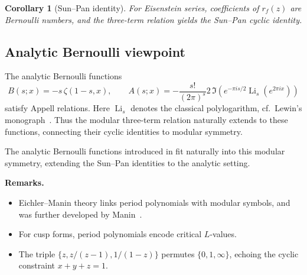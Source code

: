 \documentclass[12pt]{article}
\numberwithin{equation}{section}
\newtheorem{corollary}[theorem]{Corollary}
\newcommand{\Li}{\operatorname{Li}}
\begin{document}
\begin{corollary}[Sun--Pan identity]
For Eisenstein series, coefficients of $r_f(z)$ are Bernoulli numbers, and the
three-term relation yields the Sun--Pan cyclic identity.
\end{corollary}

\subsection*{Analytic Bernoulli viewpoint}
The analytic Bernoulli functions
\[
B(s;x)=-s\,\zeta(1-s,x),\qquad
A(s;x)=-\frac{s!}{(2\pi)^s}2\,\Im\!\left(e^{-\pi i s/2}\Li_s(e^{2\pi i x})\right)
\]
satisfy Appell relations. Here $\Li_s$ denotes the classical polylogarithm,
cf.~Lewin’s monograph~\cite{Lewin1981}.
Thus the modular three-term relation naturally extends to these functions,
connecting their cyclic identities to modular symmetry.

The analytic Bernoulli functions introduced in \cite{Nagai2025b}
fit naturally into this modular symmetry, extending the Sun--Pan
identities to the analytic setting.

\noindent\textbf{Remarks.}
\begin{itemize}
\item Eichler--Manin theory links period polynomials with modular symbols, and was further developed by Manin~\cite{Manin1972}.
\item For cusp forms, period polynomials encode critical $L$-values.
\item The triple $\{z,z/(z-1),1/(1-z)\}$ permutes $\{0,1,\infty\}$, echoing
the cyclic constraint $x+y+z=1$.
\end{itemize}
\end{document}
